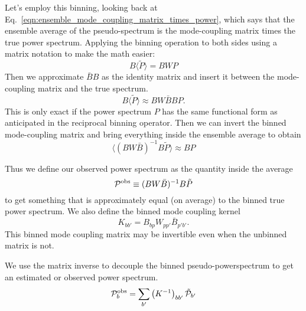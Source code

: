 Let's employ this binning, looking back at Eq.~\ref{eqn:ensemble_mode_coupling_matrix_times_power}, which says that the ensemble average of the pseudo-spectrum is the mode-coupling matrix times the true power spectrum.  Applying the binning operation to both sides using a matrix notation to make the math easier:
\begin{equation}
  B \langle \tilde P \rangle =  B W  P
\end{equation}
Then we approximate $\bar B B$ as the identity matrix and insert it between the mode-coupling matrix and the true spectrum.
\begin{equation}
  B \langle \tilde P \rangle \approx  B W {\bar B} B P. \label{eqn:bandpower_approximation}
\end{equation}
This is only exact if the power spectrum $P$ has the same functional form as anticipated in the reciprocal binning operator.  Then we can invert the binned mode-coupling matrix and bring everything inside the ensemble average to obtain
\begin{equation}
 \langle( B W {\bar B})^{-1} B \tilde P \rangle \approx B P
\end{equation}

Thus we define our observed power spectrum as the quantity inside the average
\begin{equation}
{\cal P^{\rm obs}} \equiv ( B W {\bar B})^{-1} B \tilde P 
\end{equation}
to get something that is approximately equal (on average) to the binned true power spectrum.  We also define the binned  mode coupling kernel
\begin{equation}
  K_{bb'} =  B_{bp} W_{pp'} \bar B_{p'b'}.
\end{equation}
This binned mode coupling matrix may be invertible even when the unbinned matrix is not.

We use the matrix inverse to decouple the binned pseudo-powerspectrum to get an estimated or observed power spectrum.
\begin{equation}
  {\cal P}^{\rm obs}_b = \sum_{b'} \left( K^{-1} \right)_{bb'} \tilde {\cal P}_{b'} 
\end{equation}

